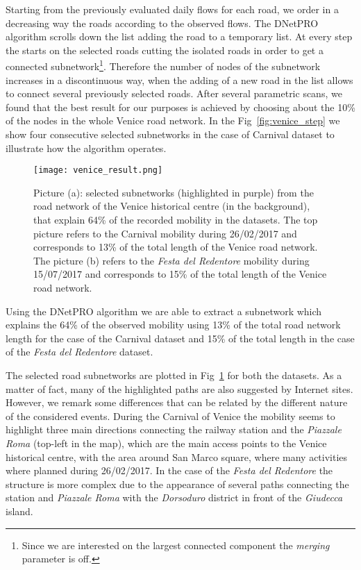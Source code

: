 \documentclass{standalone}
\begin{document}
Starting from the previously evaluated daily flows for each road, we order in a decreasing way the roads according to the observed
flows.
The DNetPRO algorithm scrolls down the list adding the road to a temporary list.
At every step the  starts on the selected roads cutting the isolated roads in order to get a connected subnetwork\footnote{
  Since we are interested on the largest connected component the \emph{merging} parameter is off.
}.
Therefore the number of nodes of the subnetwork increases in a discontinuous way, when the adding of a new road in the list allows to
connect several previously selected roads.
After several parametric scans, we found that the best result for our purposes is achieved by choosing about the 10\% of the nodes in the whole Venice road network.
In the Fig~\ref{fig:venice_step} we show four consecutive selected subnetworks in the case of Carnival dataset to illustrate how the algorithm operates.

\begin{center}
\begin{figure}[htbp]
\centering
\texttt{[image: venice\_result.png]}
\caption{Picture (a): selected subnetworks (highlighted in purple) from the road network of the Venice historical centre (in the background), that explain 64\% of the recorded mobility in the datasets.
The top picture refers to the Carnival mobility during 26/02/2017 and corresponds to 13\% of the total length of the Venice road network.
The picture (b) refers to the \emph{Festa del Redentore} mobility during 15/07/2017 and corresponds to 15\% of the total length of the Venice road network.
}
\label{fig:venice_result}
\end{figure}
\end{center}

Using the DNetPRO algorithm we are able to extract a subnetwork which explains the 64\% of the observed mobility using 13\% of the total road network length for the case of the Carnival dataset and 15\% of the total length in the case of the \emph{Festa del Redentore} dataset.

The selected road subnetworks are plotted in Fig~\ref{fig:venice_result} for both the datasets.
As a matter of fact, many of the highlighted paths are also suggested by Internet sites.
However, we remark some differences that can be related by the different nature of the considered events.
During the Carnival of Venice the mobility seems to highlight three main directions connecting the railway station and the \emph{Piazzale Roma} (top-left in the map), which are the main access points to the Venice historical centre, with the area around San Marco square, where many activities where planned during 26/02/2017.
In the case of the \emph{Festa del Redentore} the structure is more complex due to the appearance of several paths connecting the station and \emph{Piazzale Roma} with the \emph{Dorsoduro} district in front of the \emph{Giudecca} island.
\end{document}
